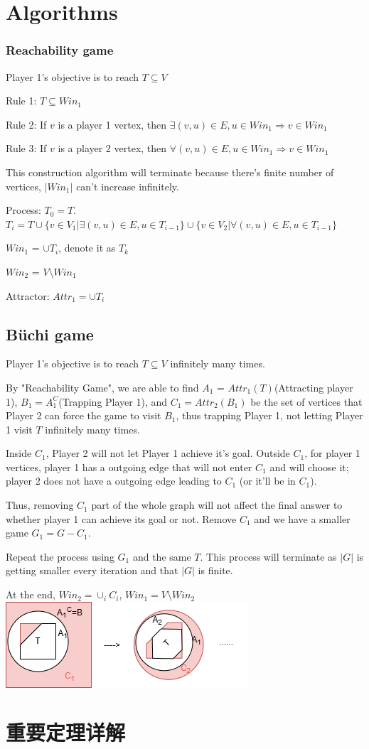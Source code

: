 \documentclass[12pt,a4paper]{ctexrep}
\begin{document}
\section{Algorithms}
\subsubsection{Reachability game}
Player 1's objective is to reach $T \subseteq V$

Rule 1: $T \subseteq Win_1$

Rule 2: If $v$ is a player 1 vertex, then $\exists (v,u) \in E, u \in Win_1 \Rightarrow v \in Win_1$

Rule 3: If $v$ is a player 2 vertex, then $\forall (v,u) \in E, u \in Win_1 \Rightarrow v \in Win_1$

This construction algorithm will terminate because there's finite number of vertices, $|Win_1|$ can't increase infinitely.

Process: $T_0 = T$. $T_i = T \cup \{v \in V_1|\exists (v,u)\in E, u \in T_{i-1}\} \cup \{v \in V_2| \forall (v,u)\in E, u \in T_{i-1}\}$

$Win_1$ = $\cup T_i$, denote it as $T_k$

$Win_2$ = $V \setminus Win_1$

Attractor: $Attr_1 = \cup T_i$
\subsection{B\"uchi game}
Player 1's objective is to reach $T \subseteq V$ infinitely many times. 

By "Reachability Game", we are able to find $A_1$ = $Attr_1(T)$(Attracting player 1), $B_1 = A_1^C$(Trapping Player 1), and $C_1 = Attr_2(B_1)$ be the set of vertices that Player 2 can force the game to visit $B_1$, thus trapping Player 1, not letting Player 1 visit $T$ infinitely many times.

Inside $C_1$, Player 2 will not let Player 1 achieve it's goal. Outside $C_1$, for player 1 vertices, player 1 has a outgoing edge that will not enter $C_1$ and will choose it; player 2 does not have a outgoing edge leading to $C_1$ (or it'll be in $C_1$).

Thus, removing $C_1$ part of the whole graph will not affect the final answer to whether player 1 can achieve its goal or not. Remove $C_1$ and we have a smaller game $G_1 = G - C_1$.

Repeat the process using $G_1$ and the same $T$. This process will terminate as $|G|$ is getting smaller every iteration and that $|G|$ is finite.

At the end, $Win_2 = \cup_i C_i$, $Win_1 = V \setminus Win_2$\\

\centering
\includegraphics[scale=0.5]{buchi_game.png}
\section{重要定理详解}
\end{document}
